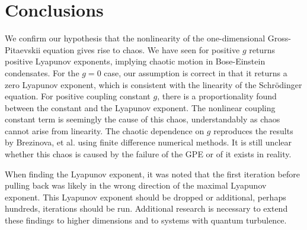 \addchapheadtotoc

\chapter{Conclusions}
We confirm our hypothesis that the nonlinearity of the one-dimensional Gross-Pitaevskii equation gives rise to chaos.
We have seen for positive $g$ returns positive Lyapunov exponents, implying chaotic motion in Bose-Einstein condensates. For the $g=0$ case, our assumption is correct in that it returns a zero Lyapunov exponent, which is consistent with the linearity of the Schr\"odinger equation. For positive coupling constant $g$, there is a proportionality found between the constant and the Lyapunov exponent. The nonlinear coupling constant term is seemingly the cause of this chaos, understandably as chaos cannot arise from linearity. The chaotic dependence on $g$ reproduces the results by Brezinova, et al. \cite{PhysRevA.83.043611} using finite difference numerical methods. It is still unclear whether this chaos is caused by the failure of the GPE or of it exists in reality.

When finding the Lyapunov exponent, it was noted that the first iteration before pulling back was likely in the wrong direction of the maximal Lyapunov exponent. This Lyapunov exponent should be dropped or additional, perhaps hundreds, iterations should be run. Additional research is necessary to extend these findings to higher dimensions and to systems with quantum turbulence.